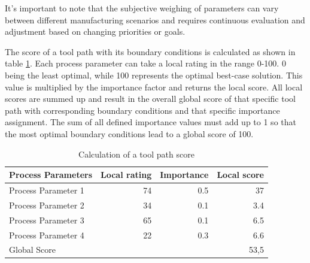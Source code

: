 It's important to note that the subjective weighing of parameters can vary between different manufacturing scenarios and requires continuous evaluation and adjustment based on changing priorities or goals.

The score of a tool path with its boundary conditions is calculated as shown in table \ref{weighting}. Each process parameter can take a local rating in the range 0-100. 0 being the least optimal, while 100 represents the optimal best-case solution. This value is multiplied by the importance factor and returns the local score. 
All local scores are summed up and result in the overall global score of that specific tool path with corresponding boundary conditions and that specific importance assignment.
The sum of all defined importance values must add up to 1 so that the most optimal boundary conditions lead to a global score of 100.


\begin{table}[H]
	\centering
	\begin{tabular}{||l|r|r|r||}
		Process Parameters & Local rating & Importance & Local score\\
		\hline
		\hline
		\hline
		
		Process Parameter 1 & 74 & 0.5 & 37\\
		Process Parameter 2 & 34& 0.1&3.4\\
		Process Parameter 3& 65& 0.1&6.5\\
		Process Parameter 4& 22&0.3&6.6\\
		\hline
		\hline
		\hline
		Global Score& & &53,5\\
		\hline
		\hline
	\end{tabular}
	
	\caption{Calculation of a tool path score}
	\label{weighting}
\end{table}


